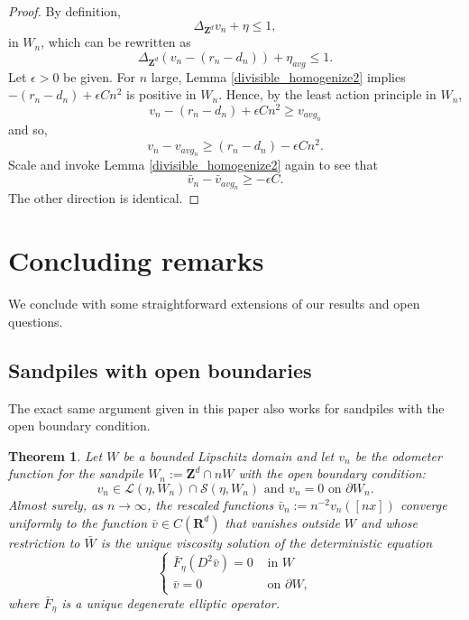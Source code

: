 \documentclass[12pt]{amsart}
\newcommand{\R}{\mathbf{R}}
\newcommand{\Z}{\mathbf{Z}}
\newtheorem{theorem}{Theorem}[section]
\begin{document}
\begin{proof}
By definition, 
\[
\Delta_{\Z^d} v_n + \eta \leq 1, 
\]
in $W_n$, which can be rewritten as 
\[
\Delta_{\Z^d} (v_n - (r_n - d_n)) + \eta_{avg} \leq 1. 
\]
Let $\epsilon > 0$ be given. For $n$ large, 
Lemma \ref{divisible_homogenize2} implies $-(r_n - d_n) + \epsilon C n^2$ is positive in $W_n$. 
Hence, by the least action principle in $W_n$, 
\[
v_n - (r_n - d_n) + \epsilon C n^2  \geq v_{avg_n}
\]
and so, 
\[
v_n - v_{avg_n} \geq (r_n - d_n) - \epsilon C n^2. 
\]
Scale and invoke Lemma \ref{divisible_homogenize2} again to see that
\[
\bar{v}_n - \bar{v}_{avg_n} \geq -\epsilon C. 
\]
The other direction is identical. 
\end{proof}


\section{Concluding remarks} \label{sec:conclusion}
We conclude with some straightforward extensions of our results and open questions. 








\subsection{Sandpiles with open boundaries}
The exact same argument given in this paper also works for sandpiles with the open boundary condition.
\begin{theorem}
Let $W$ be a bounded Lipschitz domain and let $v_n$ be the odometer function for the 
sandpile $W_n := \Z^d \cap n W$ with the open boundary condition: 
\[
v_n  \in \mathcal{L}(\eta, W_n) \cap \mathcal{S}(\eta, W_n) \mbox{ and } v_n = 0 \mbox{ on $\partial W_n$}. 
\] 
Almost surely, as $n \to \infty$, the rescaled functions $\bar{v}_n:= n^{-2} v_n([n x])$ converge uniformly to the function $\bar{v} \in C(\R^d)$ that vanishes outside $W$ and whose restriction to $\bar{W}$ is the unique viscosity solution of the deterministic equation %
\[
\begin{cases}
\bar{F}_{\eta}(D^2 \bar{v} ) = 0 &\mbox{ in $W$} \\
\bar{v} = 0  &\mbox{ on $\partial W$},
\end{cases}
\]
where $\bar{F}_\eta$ is a unique degenerate elliptic operator. 
\end{theorem}
\end{document}
